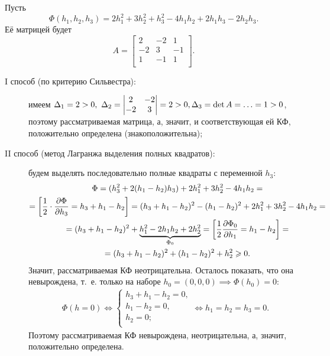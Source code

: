 \documentclass[../../main.tex]{subfiles}
\begin{document}
	\begin{exmp}
		Пусть
		\[
			\Phi(h_1, h_2, h_3)
			= 2 h_1^2 + 3 h_2^2 + h_3^2 - 4 h_1 h_2 + 2 h_1 h_3 - 2 h_2 h_3.
		\]
		Её матрицей будет
		\[
			A =
			\begin{bmatrix}
				2 & -2 & 1 \\
				-2 & 3 & -1 \\
				1 & -1 & 1 \\
			\end{bmatrix}.
		\]
		\begin{description}
			\item[I способ (по критерию Сильвестра):]
			имеем $\Delta_1 = 2 > 0,\ \Delta_2 =
			\begin{vmatrix}
				2 & -2 \\
				-2 & 3 \\
			\end{vmatrix}
			= 2 > 0, \\
			\Delta_3 = \det A = \ldots = 1 > 0$,
			поэтому рассматриваемая матрица, а, значит, и соответствующая ей КФ,
			положительно определена (знакоположительна);
			
			\item[II способ (метод Лагранжа выделения полных квадратов):]
			будем выделять последовательно полные квадраты с переменной $h_3$:
			\begin{gather*}
				\Phi
				= (h_3^2 + 2(h_1 - h_2) h_3) + 2 h_1^2 + 3 h_2^2 - 4 h_1 h_2
				= \\ = \left[\dfrac{1}{2}\cdot \frac{\partial \Phi}{\partial h_3}
				= h_3 + h_1 - h_2\right]
				= (h_3 + h_1 - h_2)^2 - (h_1 - h_2)^2 + 2 h_1^2 + 3 h_2^2
				- 4 h_1 h_2
				= \\ = (h_3 + h_1 - h_2)^2 + \underbrace{h_1^2 - 2 h_1 h_2
				+ 2 h_2^2}_{\Phi_0}
				= \left[\dfrac{1}{2} \frac{\partial \Phi_0}{\partial h_1}
				= h_1 - h_2\right]
				= \\ = (h_3 + h_1 - h_2)^2 + (h_1 - h_2)^2 + h_2^2 \geqslant 0.
			\end{gather*}
			Значит, рассматриваемая КФ неотрицательна.
			Осталось показать, что она невырождена,
			т.~е. только на наборе $h_0 = (0, 0, 0) \implies
			\Phi(h_0) = 0$:
			\begin{gather*}
				\Phi(h = 0)
				\iff
				\begin{cases}
					h_3 + h_1 - h_2 = 0, \\
					h_1 - h_2 = 0, \\
					h_2 = 0; \\
				\end{cases}
				\iff
				h_1 = h_2 = h_3 = 0.
			\end{gather*}
			Поэтому рассматриваемая КФ невырождена, неотрицательна,
			а, значит, положительно определена.
		\end{description}
	\end{exmp}
	
\end{document}
